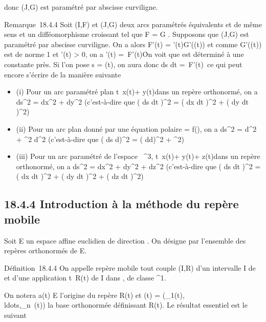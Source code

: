 \documentclass[]{article}
\begin{document}
donc (J,G) est paramétré par abscisse curviligne.

Remarque~18.4.4 Soit (I,F) et (J,G) deux arcs paramétrés équivalents et
de même sens et \theta un difféomorphisme croissant tel que F = G \cdot \theta.
Supposons que (J,G) est paramétré par abscisse curviligne. On a alors
F'(t) = \theta'(t)G'(\theta(t)) et comme G'(\theta(t)) est de norme 1 et \theta'(t)
> 0, on a \theta'(t) =\
F'(t)\. On voit que \theta est déterminé à une
constante près. Si l'on pose s = \theta(t), on aura donc  ds
\over dt =\
F'(t)\ ce qui peut encore s'écrire de la
manière suivante

\begin{itemize}
\itemsep1pt\parskip0pt
\item
  (i) Pour un arc paramétré plan
  t\mapsto~x(t)\vec\imath +
  y(t) dans un repère orthonormé, on a
  ds^2 = dx^2 + dy^2 (c'est-à-dire que
  \left ( ds \over dt
  \right )^2 = \left ( dx
  \over dt \right )^2 +
  \left ( dy \over dt
  \right )^2)
\item
  (ii) Pour un arc plan donné par une équation polaire \rho = f(\theta), on a
  ds^2 = d\rho^2 + \rho^2 d\theta^2
  (c'est-à-dire que \left ( ds \over
  d\theta \right )^2 = \left (
  d\rho \over d\theta \right )^2 +
  \rho^2)
\item
  (iii) Pour un arc paramétré de l'espace ~^3,
  t\mapsto~x(t)\vec\imath +
  y(t)\vecȷ + z(t)\veck dans un
  repère orthonormé, on a ds^2 = dx^2 +
  dy^2 + dz^2 (c'est-à-dire que
  \left ( ds \over dt
  \right )^2 = \left ( dx
  \over dt \right )^2 +
  \left ( dy \over dt
  \right )^2 + \left ( dz
  \over dt \right )^2)
\end{itemize}

\subsection{18.4.4 Introduction à la méthode du repère mobile}

Soit E un espace affine euclidien de direction \vecE.
On désigne par  l'ensemble des repères orthonormés de E.

Définition~18.4.4 On appelle repère mobile tout couple (I,R) d'un
intervalle I de ~ et d'une application t\mapsto~R(t)
de I dans \mathcal{R}, de classe \mathcal{C}^1.

On notera a(t) \in E l'origine du repère R(t) et (t) =
(\overrightarrowe_1(t),\\ldots,\overrightarrowe_n~(t))
la base orthonormée définissant R(t). Le résultat essentiel est le
suivant
\end{document}
